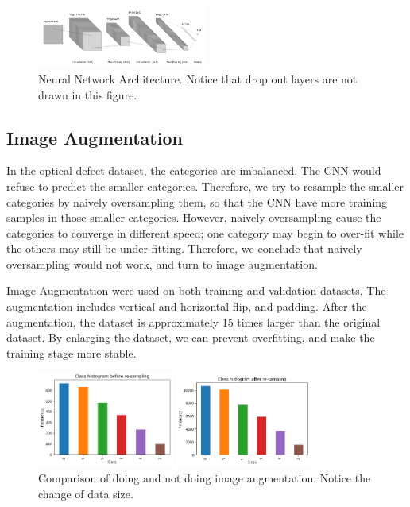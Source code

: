 \documentclass[conference]{IEEEtran}
\begin{document}
\begin{CJK}{UTF8}{bsmi}
\begin{figure}[!htbp]
\centerline{\includegraphics[width=0.5\textwidth]{../figures/nn_architecture.png}}
\caption{Neural Network Architecture. Notice that drop out layers are not drawn in this figure.}
\label{fig:CNN}
\end{figure}

\subsection{Image Augmentation}
In the optical defect dataset, the categories are imbalanced. The CNN would refuse to predict the smaller categories. Therefore, we try to resample the smaller categories by naively oversampling them, so that the CNN have more training samples in those smaller categories. However, naively oversampling cause the categories to converge in different speed; one category may begin to over-fit while the others may still be under-fitting. Therefore, we conclude that naively oversampling would not work, and turn to image augmentation.

Image Augmentation were used on both training and validation datasets. The augmentation includes vertical and horizontal flip, and padding. After the augmentation, the dataset is approximately 15 times larger than the original dataset. By enlarging the dataset, we can prevent overfitting, and make the training stage more stable.

\begin{figure}[!htbp]
\centerline{\includegraphics[width=0.4\textwidth]{../figures/training_data_before_augmentation.png}}
\centerline{\includegraphics[width=0.4\textwidth]{../figures/training_data_after_augmentation.png}}
\caption{Comparison of doing and not doing image augmentation. Notice the change of data size.}
\end{figure}


\end{CJK}
\end{document}
